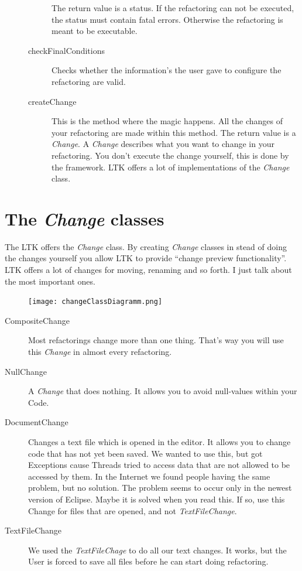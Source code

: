 \documentclass[a4paper,10pt]{report}
\begin{document}
\begin{description}
\begin{description}
The return value is a status. If the refactoring can not be executed, the status must contain fatal errors. Otherwise the refactoring is meant to be executable.
\item[checkFinalConditions] Checks whether the information's the user gave to configure the refactoring are valid. 
\item[createChange] This is the method where the magic happens. All the changes of your refactoring are made within this method. The return value is a {\it Change}. A {\it Change}
describes what you want to change in your refactoring. You don't execute the change yourself, this is done by the framework. LTK offers a lot of implementations of the {\it Change}
class. 
\end{description}
\end{description}

\section{The {\it Change} classes}
The LTK offers the {\it Change} class. By creating {\it Change} classes in stead of doing the changes yourself you allow LTK to provide ``change preview functionality''.
LTK offers a lot of changes for moving, renaming and so forth. I just talk about the most important ones.
\begin{figure}[h]
\centering
\texttt{[image: changeClassDiagramm.png]}
\end{figure}
\begin{description}
 \item[CompositeChange] Most refactorings change more than one thing. That's way you will use this {\it Change} in almost every refactoring.
 \item[NullChange] A {\it Change} that does nothing. It allows you to avoid null-values within your Code.
 \item[DocumentChange] Changes a text file which is opened in the editor. It allows you to change code that has not yet been saved. We wanted to use this, but got 
Exceptions cause Threads tried to access data that are not allowed to be accessed by them. In the Internet we found people having the same problem, but no solution. The problem seems
to occur only in the newest version of Eclipse. Maybe it is solved when you read this. If so, use this Change for files that are opened, and not {\it TextFileChange}.
 \item[TextFileChange] We used the {\it TextFileChage} to do all our text changes. It works, but the User is forced to save all files before he can start doing 
refactoring. 
\end{description}
\end{document}
